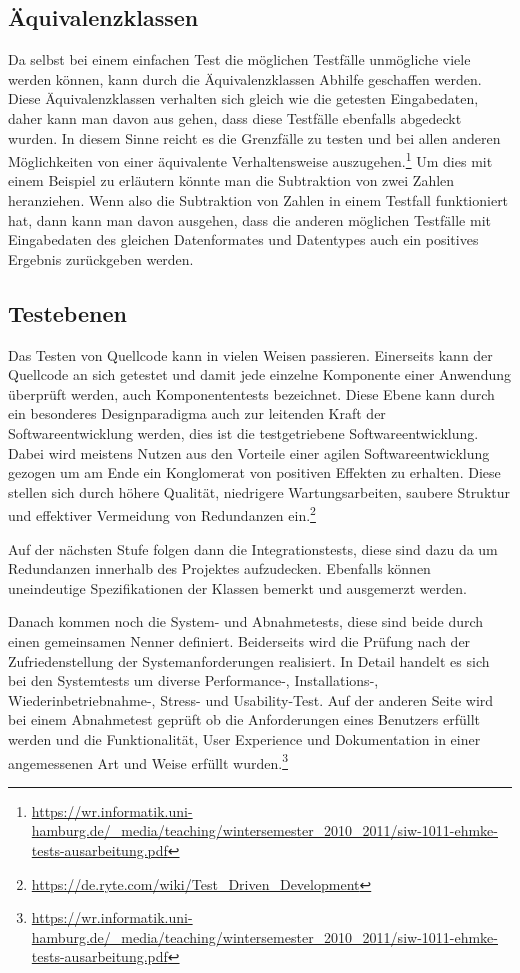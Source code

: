 \subsection{Äquivalenzklassen}
Da selbst bei einem einfachen Test die möglichen Testfälle unmögliche viele werden können, kann durch die Äquivalenzklassen Abhilfe geschaffen werden. 
Diese Äquivalenzklassen verhalten sich gleich wie die getesten Eingabedaten, daher kann man davon aus gehen, dass diese Testfälle ebenfalls abgedeckt wurden. 
In diesem Sinne reicht es die Grenzfälle zu testen und bei allen anderen Möglichkeiten von einer äquivalente Verhaltensweise auszugehen.\footnote{\url{https://wr.informatik.uni-hamburg.de/_media/teaching/wintersemester_2010_2011/siw-1011-ehmke-tests-ausarbeitung.pdf}}  
Um dies mit einem Beispiel zu erläutern könnte man die Subtraktion von zwei Zahlen heranziehen. 
Wenn also die Subtraktion von Zahlen in einem Testfall funktioniert hat, dann kann man davon ausgehen, dass die anderen möglichen Testfälle mit Eingabedaten des gleichen Datenformates und Datentypes auch ein positives Ergebnis zurückgeben werden.

\subsection{Testebenen}
Das Testen von Quellcode kann in vielen Weisen passieren. Einerseits kann der Quellcode an sich getestet und damit jede einzelne Komponente einer Anwendung überprüft werden, auch Komponententests bezeichnet.
Diese Ebene kann durch ein besonderes Designparadigma auch zur leitenden Kraft der Softwareentwicklung werden, dies ist die testgetriebene Softwareentwicklung.
Dabei wird meistens Nutzen aus den Vorteile einer agilen Softwareentwicklung gezogen um am Ende ein Konglomerat von positiven Effekten zu erhalten.
Diese stellen sich durch höhere Qualität, niedrigere Wartungsarbeiten, saubere Struktur und effektiver Vermeidung von Redundanzen ein.\footnote{\url{https://de.ryte.com/wiki/Test_Driven_Development}}

Auf der nächsten Stufe folgen dann die Integrationstests, diese sind dazu da um Redundanzen innerhalb des Projektes aufzudecken. Ebenfalls können uneindeutige Spezifikationen der Klassen bemerkt und ausgemerzt werden.

Danach kommen noch die System- und Abnahmetests, diese sind beide durch einen gemeinsamen Nenner definiert. Beiderseits wird die Prüfung nach der Zufriedenstellung der Systemanforderungen realisiert.
In Detail handelt es sich bei den Systemtests um diverse Performance-, Installations-, Wiederinbetriebnahme-, Stress- und Usability-Test.
Auf der anderen Seite wird bei einem Abnahmetest geprüft ob die Anforderungen eines Benutzers erfüllt werden und die Funktionalität, User Experience und Dokumentation in einer angemessenen Art und Weise erfüllt wurden.\footnote{\url{https://wr.informatik.uni-hamburg.de/_media/teaching/wintersemester_2010_2011/siw-1011-ehmke-tests-ausarbeitung.pdf}} 

